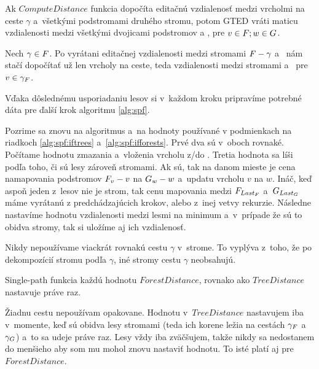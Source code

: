 \begin{lemma}
  Ak $ComputeDistance$ funkcia dopočíta editačnú vzdialenosť medzi vrcholmi na ceste $\gamma$
  a~všetkými podstromami druhého stromu, potom GTED vráti maticu vzdialenosti
  medzi všetkými dvojicami podstromov  a , pre $v \in F; w \in G$.
\end{lemma}

\begin{dukaz}
  Nech $\gamma \in F$. Po vyrátani editačnej vzdialenosti medzi stromami
  $F - \gamma$ a~ nám stačí dopočítať už len vrcholy na ceste,
  teda vzdialenosti medzi stromami  a~ pre $v \in \gamma_{F}$.
\end{dukaz}

Vďaka dôslednému usporiadaniu lesov si v~každom kroku pripravíme potrebné
dáta pre ďalší krok algoritmu \ref{alg:spf}.

Pozrime sa znovu na algoritmus a~na hodnoty používané v podmienkach na riadkoch
\ref{alg:spf:iftrees} a~\ref{alg:spf:ifforests}. Prvé dva sú v~oboch rovnaké.
Počítame hodnotu zmazania a~vloženia vrcholu \mbox{z/do} .
Tretia hodnota sa líši podľa toho, či sú lesy zároveň stromami. Ak sú, tak na danom mieste
je cena namapovania podstromov $F_{v} - v$ na $G_{w} - w$ a~updatu vrcholu $v$ na $w$.
Ináč, keď aspoň jeden z~lesov nie je strom, tak cenu mapovania medzi
$F_{Last_{F}}$ a~$G_{Last_{G}}$
máme vyrátanú z predchádzajúcich krokov, alebo z~inej vetvy rekurzie.
Následne nastavíme hodnotu vzdialenosti medzi lesmi na minimum a~v~prípade že sú to obidva stromy,
tak si uložíme aj ich vzdialenosť.

\begin{pozn}
  Nikdy nepoužívame viackrát rovnakú cestu $\gamma$ v~strome. To vyplýva z~toho, že po dekompozícií
  stromu podľa $\gamma$, iné stromy cestu $\gamma$ neobsahujú.
\end{pozn}

\begin{pozn}
  Single-path funkcia každú hodnotu $ForestDistance$, rovnako ako $TreeDistance$ nastavuje
  práve raz.
\end{pozn}

\begin{dukaz}
  Žiadnu cestu nepoužívam opakovane. Hodnotu v~$TreeDistance$ nastavujem iba v~momente,
  keď sú obidva lesy stromami (teda ich korene ležia na cestách
  $\gamma_{F}$ a~$\gamma_{G}$) a~to sa udeje práve raz.
  Lesy vždy iba zväčšujem, takže nikdy sa nedostanem do menšieho aby som mu mohol znovu nastaviť
  hodnotu. To isté platí aj pre $ForestDistance$.
\end{dukaz}

